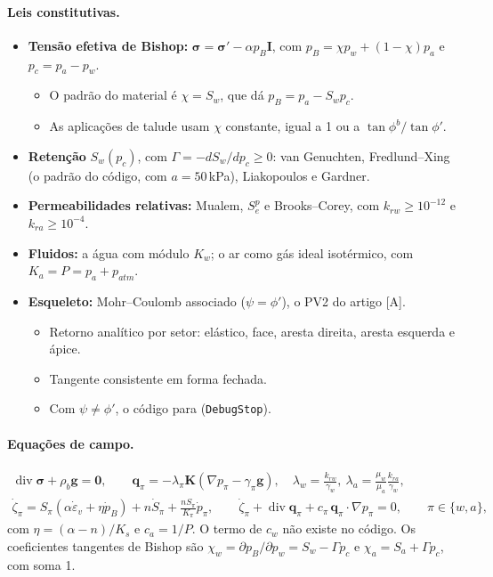\paragraph{Leis constitutivas.}
\begin{itemize}
  \item \textbf{Tensão efetiva de Bishop:} $\bm\sigma = \bm\sigma' - \alpha p_B \bm I$, com
    $p_B = \chi p_w + (1 - \chi) p_a$ e $p_c = p_a - p_w$.
    \begin{itemize}
      \item O padrão do material é $\chi = S_w$, que dá $p_B = p_a - S_w p_c$.
      \item As aplicações de talude usam $\chi$ constante, igual a 1 ou a $\tan\phi^b/\tan\phi'$.
    \end{itemize}
  \item \textbf{Retenção} $S_w(p_c)$, com $\Gamma = -dS_w/dp_c \geq 0$: van Genuchten, Fredlund--Xing (o padrão do
    código, com $a = 50$\,kPa), Liakopoulos e Gardner.
  \item \textbf{Permeabilidades relativas:} Mualem, $S_e^p$ e Brooks--Corey, com $k_{rw} \geq 10^{-12}$ e
    $k_{ra} \geq 10^{-4}$.
  \item \textbf{Fluidos:} a água com módulo $K_w$; o ar como gás ideal isotérmico, com $K_a = P = p_a + p_{atm}$.
  \item \textbf{Esqueleto:} Mohr--Coulomb associado ($\psi = \phi'$), o PV2 do artigo [A].
    \begin{itemize}
      \item Retorno analítico por setor: elástico, face, aresta direita, aresta esquerda e ápice.
      \item Tangente consistente em forma fechada.
      \item Com $\psi \neq \phi'$, o código para (\texttt{DebugStop}).
    \end{itemize}
\end{itemize}

\paragraph{Equações de campo.}
\begin{gather}
  \operatorname{div}\bm\sigma + \rho_b \bm g = \bm 0, \qquad
  \bm q_\pi = -\lambda_\pi \bm K (\nabla p_\pi - \gamma_\pi \bm g), \quad
  \lambda_w = \frac{k_{rw}}{\gamma_w}, \ \lambda_a = \frac{\mu_w}{\mu_a}\frac{k_{ra}}{\gamma_w}, \\
  \dot\zeta_\pi = S_\pi(\alpha\dot\varepsilon_v + \eta\dot p_B) + n\dot S_\pi + \frac{nS_\pi}{K_\pi}\dot p_\pi, \qquad
  \dot\zeta_\pi + \operatorname{div}\bm q_\pi + c_\pi\, \bm q_\pi\cdot\nabla p_\pi = 0, \qquad \pi \in \{w, a\},
\end{gather}
com $\eta = (\alpha - n)/K_s$ e $c_a = 1/P$. O termo de $c_w$ não existe no código. Os coeficientes tangentes de
Bishop são $\chi_w = \partial p_B/\partial p_w = S_w - \Gamma p_c$ e $\chi_a = S_a + \Gamma p_c$, com soma 1.

